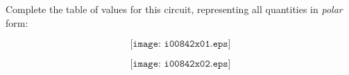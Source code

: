 

Complete the table of values for this circuit, representing all quantities in {\it polar} form:

$$\texttt{[image: i00842x01.eps]}$$







$$\texttt{[image: i00842x02.eps]}$$











